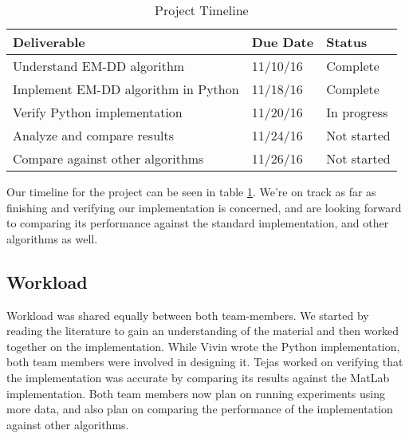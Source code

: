 \documentclass[conference]{IEEEtran}
\begin{document}
\begin{table}[]
\centering
\caption{Project Timeline}
\label{timeline}
\begin{tabular}{|l|l|l|}
\hline
\rowcolor[HTML]{333333} 
{\color[HTML]{FFFFFF} Deliverable}  & {\color[HTML]{FFFFFF} Due Date} & {\color[HTML]{FFFFFF} Status} \\ \hline
Understand EM-DD algorithm          & 11/10/16                        & Complete                      \\ \hline
\rowcolor[HTML]{EFEFEF} 
Implement EM-DD algorithm in Python & 11/18/16                        & Complete                      \\ \hline
Verify Python implementation        & 11/20/16                        & In progress                   \\ \hline
\rowcolor[HTML]{EFEFEF} 
Analyze and compare results         & 11/24/16                        & Not started                   \\ \hline
Compare against other algorithms    & 11/26/16                        & Not started                   \\ \hline
\end{tabular}
\end{table}

Our timeline for the project can be seen in table \ref{timeline}. We're on track as far as finishing and verifying our implementation is concerned, and are looking forward to comparing its performance against the standard implementation, and other algorithms as well.

\subsection{Workload}

Workload was shared equally between both team-members. We started by reading the literature to gain an understanding of the material and then worked together on the implementation. While Vivin wrote the Python implementation, both team members were involved in designing it. Tejas worked on verifying that the implementation was accurate by comparing its results against the MatLab implementation. Both team members now plan on running experiments using more data, and also plan on comparing the performance of the implementation against other algorithms.
\end{document}
